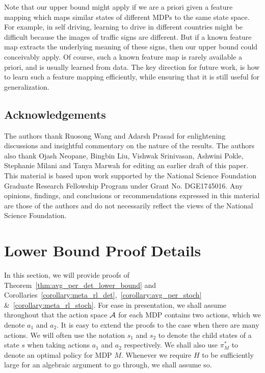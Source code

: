 \documentclass[11pt,twoside]{article}
\begin{document}
Note that our upper bound might apply if we are a priori given a feature mapping which maps similar states of different MDPs to the same state space. For example, in self driving, learning to drive in different countries might be difficult because the images of traffic signs are different. But if a known feature map extracts the underlying meaning of these signs, then our upper bound could conceivably apply. Of course, such a known feature map is rarely available a priori, and is usually learned from data. The key direction for future work, is how to learn such a feature mapping efficiently, while ensuring that it is still useful for generalization.

\subsection*{Acknowledgements}
The authors thank Ruosong Wang and Adarsh Prasad for enlightening discussions and insightful commentary on the nature of the results. The authors also thank Ojash Neopane, Bingbin Liu, Vishwak Srinivasan, Ashwini Pokle, Stephanie Milani and Tanya Marwah for editing an earlier draft of this paper. This material is based upon work supported by the National Science Foundation Graduate Research Fellowship Program under Grant No. DGE1745016. Any opinions, findings, and conclusions or recommendations expressed in this material are those of the authors and do not necessarily reflect the views of the National Science Foundation.












\appendix
\section{Lower Bound Proof Details}
\label{app:lower}
In this section, we will provide proofs of Theorem~\ref{thm:avg_per_det_lower_bound} and Corollaries~\ref{corollary:meta_rl_det},~\ref{corollary:avg_per_stoch} \&~\ref{corollary:meta_rl_stoch}. For ease in presentation, we shall assume throughout that the action space $\operatorname{\mathcal{A}}$ for each MDP contains two actions, which we denote $a_1$ and $a_2$. It is easy to extend the proofs to the case when there are many actions. We will often use the notation $s_1$ and $s_2$ to denote the child states of a state $s$ when taking actions $a_1$ and $a_2$ respectively. We shall also use $\pi^*_M$ to denote an optimal policy for MDP $M$. Whenever we require $H$ to be sufficiently large for an algebraic argument to go through, we shall assume so.
\end{document}
